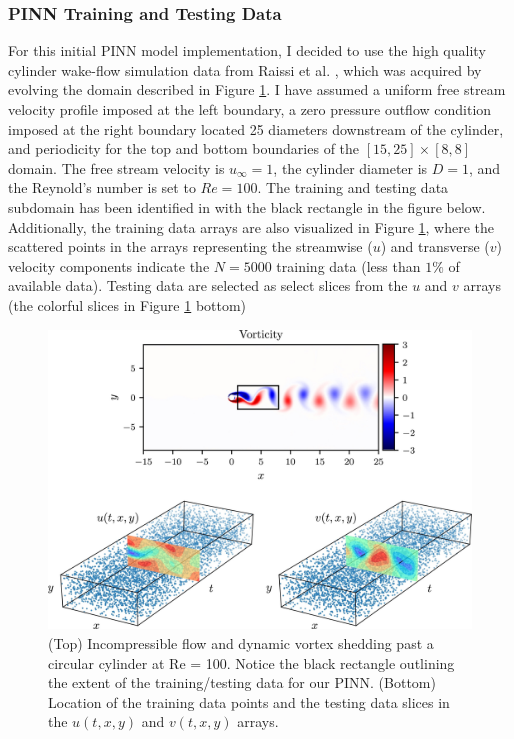 \subsubsection{PINN Training and Testing Data}
For this initial PINN model implementation, I decided to use the high quality cylinder wake-flow simulation data from Raissi et al. \cite{Raissi2019}, which was acquired by evolving the domain described in Figure \ref{fig:Pinn Domain}. I have assumed a uniform free stream velocity proﬁle imposed at the left boundary, a zero pressure outﬂow condition imposed at the right boundary located 25 diameters downstream of the cylinder, and periodicity for the top and bottom boundaries of the $[15, 25] \times [8, 8]$ domain. The free stream velocity is $u_{\infty} = 1$, the cylinder diameter is $D = 1$, and the Reynold's number is set to $Re = 100$. The training and testing data subdomain has been identified in with the black rectangle in the figure below. Additionally, the training data arrays are also visualized in Figure \ref{fig:Pinn Domain}, where the scattered points in the arrays representing the streamwise ($u$) and transverse ($v$) velocity components indicate the $N = 5000$ training data (less than $1 \%$ of available data). Testing data are selected as select slices from the $u$ and $v$ arrays (the colorful slices in Figure \ref{fig:Pinn Domain} bottom)

\begin{figure}[h]
    \centering
    \includegraphics[width=\textwidth]{Figures/PINN Domain.jpg}
    \caption{(Top) Incompressible ﬂow and dynamic vortex shedding past a circular cylinder at Re = 100. Notice the black rectangle outlining the extent of the training/testing data for our PINN. (Bottom) Location of the training data points and the testing data slices in the $u(t,x,y)$ and $v(t,x,y)$ arrays. \cite{Raissi2019}}
    \label{fig:Pinn Domain}
\end{figure}

